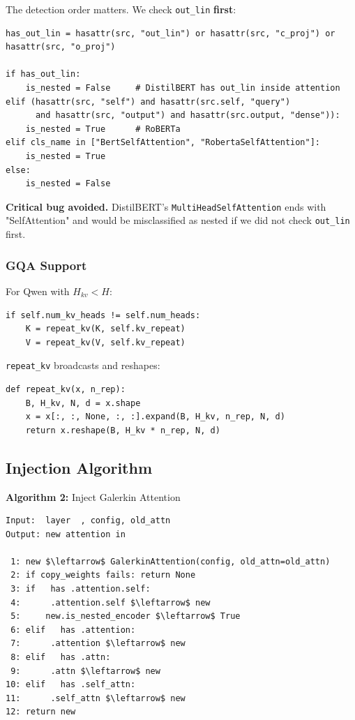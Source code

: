 The detection order matters. We check \texttt{out\_lin} \textbf{first}:

\begin{lstlisting}
has_out_lin = hasattr(src, "out_lin") or hasattr(src, "c_proj") or hasattr(src, "o_proj")

if has_out_lin:
    is_nested = False     # DistilBERT has out_lin inside attention
elif (hasattr(src, "self") and hasattr(src.self, "query")
      and hasattr(src, "output") and hasattr(src.output, "dense")):
    is_nested = True      # RoBERTa
elif cls_name in ["BertSelfAttention", "RobertaSelfAttention"]:
    is_nested = True
else:
    is_nested = False
\end{lstlisting}

\textbf{Critical bug avoided.} DistilBERT's \texttt{MultiHeadSelfAttention} ends with 
"SelfAttention" and would be misclassified as nested if we did not check 
\texttt{out\_lin} first.

\subsubsection{GQA Support}

For Qwen with $H_{kv} < H$:

\begin{lstlisting}
if self.num_kv_heads != self.num_heads:
    K = repeat_kv(K, self.kv_repeat)
    V = repeat_kv(V, self.kv_repeat)
\end{lstlisting}

\texttt{repeat\_kv} broadcasts and reshapes:

\begin{lstlisting}
def repeat_kv(x, n_rep):
    B, H_kv, N, d = x.shape
    x = x[:, :, None, :, :].expand(B, H_kv, n_rep, N, d)
    return x.reshape(B, H_kv * n_rep, N, d)
\end{lstlisting}

\subsection{Injection Algorithm}

\textbf{Algorithm 2:} Inject Galerkin Attention
\begin{lstlisting}
Input:  layer  , config, old_attn
Output: new attention in  

 1: new $\leftarrow$ GalerkinAttention(config, old_attn=old_attn)
 2: if copy_weights fails: return None
 3: if   has .attention.self:
 4:      .attention.self $\leftarrow$ new
 5:     new.is_nested_encoder $\leftarrow$ True
 6: elif   has .attention:
 7:      .attention $\leftarrow$ new
 8: elif   has .attn:
 9:      .attn $\leftarrow$ new
10: elif   has .self_attn:
11:      .self_attn $\leftarrow$ new
12: return new
\end{lstlisting}

